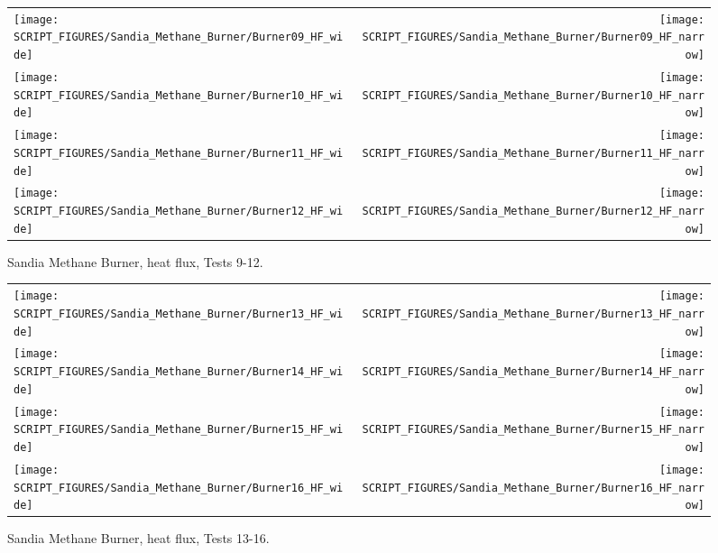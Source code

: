 \begin{figure}[p]
\begin{tabular*}{\textwidth}{l@{\extracolsep{\fill}}r}
\texttt{[image: SCRIPT\_FIGURES/Sandia\_Methane\_Burner/Burner09\_HF\_wide]} &
\texttt{[image: SCRIPT\_FIGURES/Sandia\_Methane\_Burner/Burner09\_HF\_narrow]} \\
\texttt{[image: SCRIPT\_FIGURES/Sandia\_Methane\_Burner/Burner10\_HF\_wide]} &
\texttt{[image: SCRIPT\_FIGURES/Sandia\_Methane\_Burner/Burner10\_HF\_narrow]} \\
\texttt{[image: SCRIPT\_FIGURES/Sandia\_Methane\_Burner/Burner11\_HF\_wide]} &
\texttt{[image: SCRIPT\_FIGURES/Sandia\_Methane\_Burner/Burner11\_HF\_narrow]} \\
\texttt{[image: SCRIPT\_FIGURES/Sandia\_Methane\_Burner/Burner12\_HF\_wide]} &
\texttt{[image: SCRIPT\_FIGURES/Sandia\_Methane\_Burner/Burner12\_HF\_narrow]}
\end{tabular*}
\caption[Sandia Methane Burner, heat flux, Tests 9-12] {Sandia Methane Burner, heat flux, Tests 9-12.}
\label{Sandia_Methane_Burner_HF_3}
\end{figure}

\begin{figure}[p]
\begin{tabular*}{\textwidth}{l@{\extracolsep{\fill}}r}
\texttt{[image: SCRIPT\_FIGURES/Sandia\_Methane\_Burner/Burner13\_HF\_wide]} &
\texttt{[image: SCRIPT\_FIGURES/Sandia\_Methane\_Burner/Burner13\_HF\_narrow]} \\
\texttt{[image: SCRIPT\_FIGURES/Sandia\_Methane\_Burner/Burner14\_HF\_wide]} &
\texttt{[image: SCRIPT\_FIGURES/Sandia\_Methane\_Burner/Burner14\_HF\_narrow]} \\
\texttt{[image: SCRIPT\_FIGURES/Sandia\_Methane\_Burner/Burner15\_HF\_wide]} &
\texttt{[image: SCRIPT\_FIGURES/Sandia\_Methane\_Burner/Burner15\_HF\_narrow]} \\
\texttt{[image: SCRIPT\_FIGURES/Sandia\_Methane\_Burner/Burner16\_HF\_wide]} &
\texttt{[image: SCRIPT\_FIGURES/Sandia\_Methane\_Burner/Burner16\_HF\_narrow]}
\end{tabular*}
\caption[Sandia Methane Burner, heat flux, Tests 13-16] {Sandia Methane Burner, heat flux, Tests 13-16.}
\label{Sandia_Methane_Burner_HF_4}
\end{figure}

